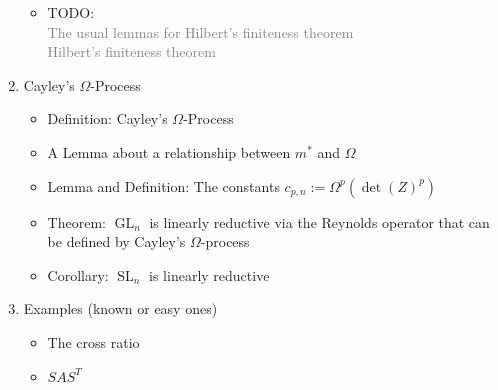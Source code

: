 \documentclass{article}
\begin{document}
\begin{enumerate}
\begin{itemize}
  \item TODO:\\
    \textcolor{gray}{The usual lemmas for Hilbert's finiteness theorem}\\
    \textcolor{gray}{Hilbert's finiteness theorem}
  \end{itemize}
\item Cayley's $\Omega$-Process
  \begin{itemize}
  \item Definition:  Cayley's $\Omega$-Process
  \item A Lemma about a relationship between $m^\ast$ and $\Omega$
  \item Lemma and Definition:  The constants $c_{p,n} := \Omega^p (\operatorname{det}(Z)^p)$
  \item Theorem:  $\operatorname{GL}_n$ is linearly reductive via the Reynolds operator that can be defined by Cayley's $\Omega$-process
  \item Corollary:  $\operatorname{SL}_n$ is linearly reductive
  \end{itemize}
\item Examples (known or easy ones)
  \begin{itemize}
  \item The cross ratio
  \item $SAS^T$
  \end{itemize}
\end{enumerate}
\end{document}
